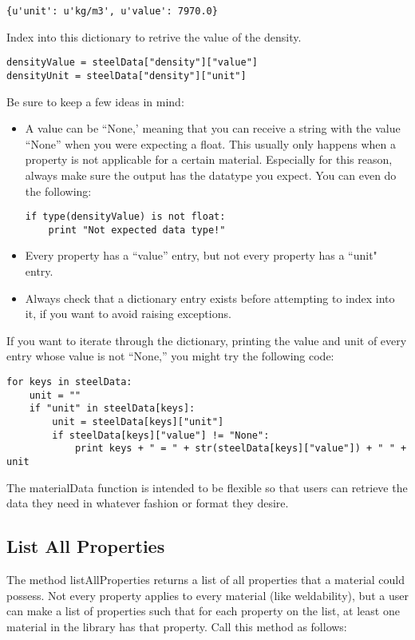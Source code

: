\documentclass[letter]{article}
\begin{document}
\begin{lstlisting}
{u'unit': u'kg/m3', u'value': 7970.0}
\end{lstlisting}

Index into this dictionary to retrive the value of the density.
\begin{lstlisting}
densityValue = steelData["density"]["value"]
densityUnit = steelData["density"]["unit"]
\end{lstlisting}

Be sure to keep a few ideas in mind:
\begin{itemize}
\item A value can be ``None,' meaning that you can receive a string with the value ``None'' when you were expecting a float. This usually only happens when a property is not applicable for a certain material. Especially for this reason, always make sure the output has the datatype you expect. You can even do the following:
\begin{lstlisting}
if type(densityValue) is not float:
    print "Not expected data type!"
\end{lstlisting}
\item Every property has a ``value'' entry, but not every property has a ``unit" entry.  
\item Always check that a dictionary entry exists before attempting to index into it, if you want to avoid raising exceptions.
\end{itemize}

If you want to iterate through the dictionary, printing the value and unit of every entry whose value is not ``None,'' you might try the following code:

\begin{lstlisting}
for keys in steelData:
    unit = ""
    if "unit" in steelData[keys]:
        unit = steelData[keys]["unit"]
        if steelData[keys]["value"] != "None":
            print keys + " = " + str(steelData[keys]["value"]) + " " + unit
\end{lstlisting}

The materialData function is intended to be flexible so that users can retrieve the data they need in whatever fashion or format they desire.


\subsection{List All Properties}
The method listAllProperties returns a list of all properties that a material could possess. Not every property applies to every material (like weldability), but a user can make a list of properties such that for each property on the list, at least one material in the library has that property. Call this method as follows:
\end{document}
